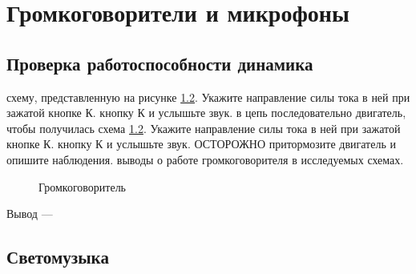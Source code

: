 \newpage

\section{Громкоговорители и микрофоны}    



\subsection{Проверка работоспособности динамика}

\begin{enumerate}
     схему, представленную на рисунке \ref{}. Укажите направление силы тока в ней при зажатой кнопке К.
     кнопку К и услышьте звук.
     в цепь последовательно двигатель, чтобы получилась схема \ref{}. Укажите направление силы тока в ней при зажатой кнопке К.
     кнопку К и услышьте звук. ОСТОРОЖНО притормозите двигатель и опишите наблюдения.
     выводы о работе громкоговорителя в исследуемых схемах. 
\end{enumerate}


\begin{figure}[h]
\begin{minipage}[h]{0.5\linewidth}
\end{minipage}
\hfill
\begin{minipage}[h]{0.5\linewidth}
\end{minipage}
\caption{Громкоговоритель}
\label{ris:10.1}
\end{figure}



Вывод --- \hrulefill

\hrulefill

\hrulefill

\subsection{Светомузыка}

